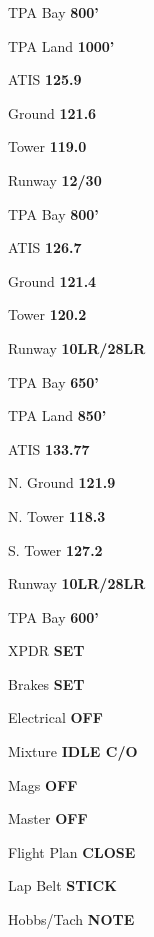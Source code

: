 \documentclass[8pt]{article}
\begin{document}
\begin{multicols*}{3}
TPA Bay \dotfill \textbf{800'}

TPA Land \dotfill \textbf{1000'}

\colorbox{orange!60}{}

ATIS \dotfill \textbf{125.9}

Ground \dotfill \textbf{121.6}

Tower \dotfill \textbf{119.0}

Runway \dotfill \textbf{12/30}

TPA Bay \dotfill \textbf{800'}

\colorbox{orange!60}{}

ATIS \dotfill \textbf{126.7}

Ground \dotfill \textbf{121.4}

Tower \dotfill \textbf{120.2}

Runway \dotfill \textbf{10LR/28LR}

TPA Bay \dotfill \textbf{650'}

TPA Land \dotfill \textbf{850'}

\colorbox{orange!60}{}

ATIS \dotfill \textbf{133.77}

N. Ground \dotfill \textbf{121.9}

N. Tower \dotfill \textbf{118.3}

S. Tower \dotfill \textbf{127.2}

Runway \dotfill \textbf{10LR/28LR}

TPA Bay \dotfill \textbf{600'} \\


\colorbox{green!80!red}{}

XPDR \dotfill \textbf{SET}

Brakes \dotfill \textbf{SET}

Electrical \dotfill \textbf{OFF}

Mixture \dotfill \textbf{IDLE C/O}

Mags \dotfill \textbf{OFF}

Master \dotfill \textbf{OFF}

Flight Plan \dotfill \textbf{CLOSE}

\colorbox{green!80!red}{}

Lap Belt \dotfill \textbf{STICK}

Hobbs/Tach \dotfill \textbf{NOTE}


\end{multicols*}
\end{document}
